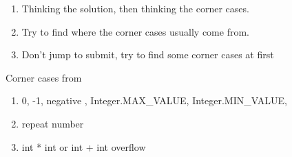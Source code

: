 \begin{enumerate}
    \item Thinking the solution, then thinking the corner cases.
    \item Try to find where the corner cases usually come from.
    \item Don't jump to submit, try to find some corner cases at first
\end{enumerate}

Corner cases from

\begin{enumerate}
    \item  0, -1, negative , Integer.MAX\_VALUE, Integer.MIN\_VALUE,
    \item  repeat number
    \item  int * int or int + int overflow
\end{enumerate}



